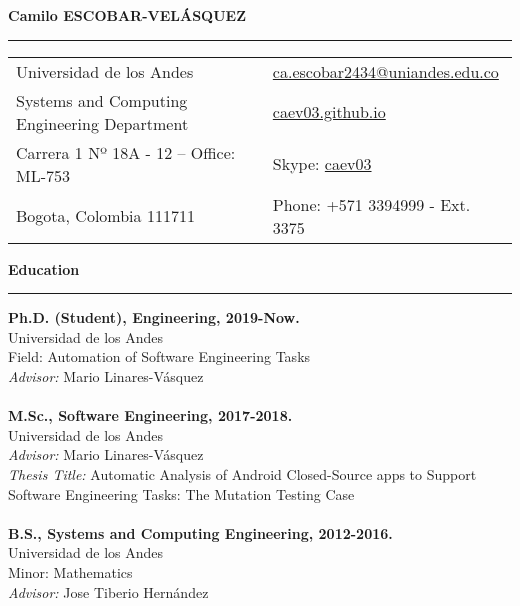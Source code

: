 \documentclass[letterpaper,11pt,oneside]{article}
\newcommand*{\Skype}{\href{skype:caev03?add}{caev03}}
\newcommand{\Absender}[1][\normalsize]{\Skype}
\begin{document}

\noindent \LARGE{\textbf{Camilo ESCOBAR-VEL\'{A}SQUEZ}} \\
\vspace{-2ex}
\hrule 
\normalsize


\begin{center}
\begin{tabular}{ll}
 Universidad de los Andes    & \hspace{0.5in} \href{mailto:ca.escobar2434@uniandes.edu.co}{ca.escobar2434@uniandes.edu.co} \\
 Systems and Computing Engineering Department    & \hspace{0.5in}  \href{https://caev03.github.io}{caev03.github.io}   \\
 Carrera 1 Nº 18A - 12 --	Office: ML-753           & \hspace{0.5in} Skype: \Absender  \\
 Bogota, Colombia 111711 & \hspace{0.5in} Phone: +571 3394999 - Ext. 3375 \\
\end{tabular}
\end{center}

\vspace{1em}


\noindent \Large{\textbf{Education}} \\
\vspace{-2ex}
\hrule 
\normalsize
\vspace{2ex}
\noindent \textbf{Ph.D. (Student), Engineering, 2019-Now.} \\
	Universidad de los Andes \\
	Field: Automation of Software Engineering Tasks \\
	\textit{Advisor:} Mario Linares-V\'{a}squez \\
	\\
\textbf{M.Sc., Software Engineering, 2017-2018.} \\
	Universidad de los Andes \\
	\textit{Advisor:} Mario Linares-V\'{a}squez \\
	\textit{Thesis Title:} Automatic Analysis of Android Closed-Source apps to Support Software Engineering Tasks: The Mutation Testing Case \\
	\\
\textbf{B.S., Systems and Computing Engineering, 2012-2016.} \\
	Universidad de los Andes \\
	Minor: Mathematics \\
	\textit{Advisor:} Jose Tiberio Hern\'{a}ndez \\
	
\end{document}
